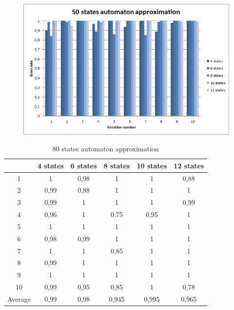 \documentclass[runningheads,a4paper]{llncs}
\begin{document}
\begin{figure}
\centering
\includegraphics[scale=1]{4.png}
\end{figure}

\begin{table}[]
\centering
\caption{80 states automaton approximation}
\label{my-label}
\begin{tabular}{@{}cccccc@{}}
\toprule
        & 4 states & 6 states & 8 states & 10 states & 12 states    \\ \midrule
1       & 1        & 0,98     & 1        & 1         & 0,88 \\
2       & 0,99     & 0,88     & 1        & 1         & 1 \\
3       & 0,99     & 1        & 1        & 1         & 0,99 \\
4       & 0,96     & 1        & 0,75     & 0,95      & 1   \\
5       & 1        & 1        & 1        & 1         & 1   \\
6       & 0,98     & 0,99     & 1        & 1         & 1    \\
7       & 1        & 1        & 0,85     & 1         & 1    \\
8       & 0,99     & 1        & 1        & 1         & 1     \\
9       & 1        & 1        & 1        & 1         & 1 \\
10      & 0,99     & 0,95     & 0,85     & 1         & 0,78  \\
Average & 0,99     & 0,98     & 0,945    & 0,995     & 0,965  \\ \bottomrule
\end{tabular}
\end{table}
\end{document}
